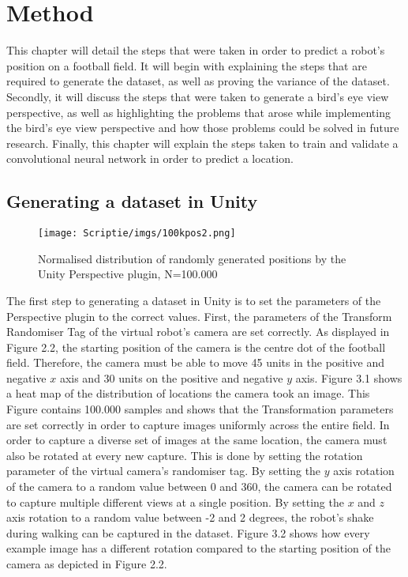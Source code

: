\documentclass{uva-inf-bachelor-thesis}
\begin{document}

\chapter{Method}
    This chapter will detail the steps that were taken in order to predict a robot's position on a football field. It will begin with explaining the steps that are required to generate the dataset, as well as proving the variance of the dataset. Secondly, it will discuss the steps that were taken to generate a bird's eye view perspective, as well as highlighting the problems that arose while implementing the bird's eye view perspective and how those problems could be solved in future research. Finally, this chapter will explain the steps taken to train and validate a convolutional neural network in order to predict a location. 

    \section{Generating a dataset in Unity}
        \begin{figure}[H]
        \centering
        \texttt{[image: Scriptie/imgs/100kpos2.png]}
        \caption{Normalised distribution of randomly generated positions by the Unity Perspective plugin, N=100.000}
        \end{figure}
        
        The first step to generating a dataset in Unity is to set the parameters of the Perspective plugin to the correct values. First, the parameters of the Transform Randomiser Tag of the virtual robot's camera are set correctly. As displayed in Figure 2.2, the starting position of the camera is the centre dot of the football field. Therefore, the camera must be able to move 45 units in the positive and negative $x$ axis and 30 units on the positive and negative $y$ axis. 
        Figure 3.1 shows a heat map of the distribution of locations the camera took an image. This Figure contains 100.000 samples and shows that the Transformation parameters are set correctly in order to capture images uniformly across the entire field.
        In order to capture a diverse set of images at the same location, the camera must also be rotated at every new capture. This is done by setting the rotation parameter of the virtual camera's randomiser tag. By setting the $y$ axis rotation of the camera to a random value between 0 and 360, the camera can be rotated to capture multiple different views at a single position. By setting the $x$ and $z$ axis rotation to a random value between -2 and 2 degrees, the robot's shake during walking can be captured in the dataset. Figure 3.2 shows how every example image has a different rotation compared to the starting position of the camera as depicted in Figure 2.2.
\end{document}
